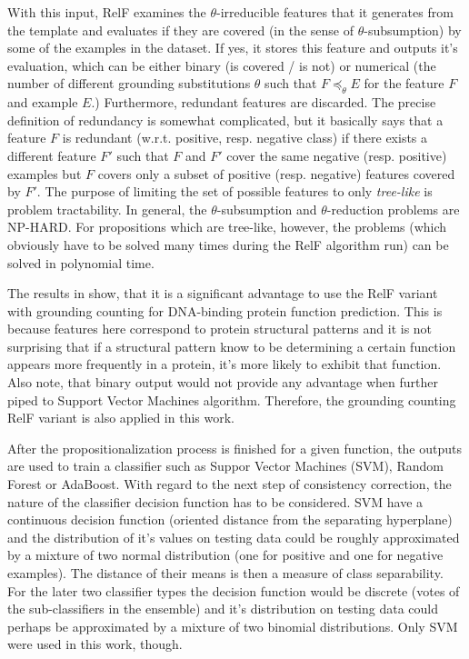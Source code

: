 \documentclass[11pt,twoside,a4paper]{book}
\begin{document}
With this input, RelF examines the $\theta$-irreducible features that it generates from
the template and evaluates if they are covered (in the sense of $\theta$-subsumption)
by some of the examples in the dataset.
If yes, it stores this feature and outputs it's evaluation,
which can be either binary (is covered / is not)
or numerical (the number of different grounding substitutions $\theta$ 
such that $F \preceq_{\theta} E$ for the feature $F$ and example $E$.)
Furthermore, redundant features are discarded.
The precise definition of redundancy \cite{relf} is somewhat complicated,
but it basically says that a feature $F$ is redundant (w.r.t. positive, resp. negative class)
if there exists a different feature $F'$ such that $F$ and $F'$ cover
the same negative (resp. positive) examples but $F$ covers only a subset
of positive (resp. negative) features covered by $F'$.
The purpose of limiting the set of possible features to only \emph{tree-like}
is problem tractability.
In general,
the $\theta$-subsumption and $\theta$-reduction problems are NP-HARD.
For propositions which are tree-like, however, the problems 
(which obviously have to be solved many times during the RelF algorithm run)
can be solved in polynomial time.

The results in \cite{szabova} show,
that it is a significant advantage to use the RelF variant with grounding counting
for DNA-binding protein function prediction.
This is because features here correspond to protein structural patterns and
it is not surprising that if a structural pattern know to be determining a certain function
appears more frequently in a protein, it's more likely to exhibit that function.
Also note, that binary output would not provide any advantage when further piped to Support Vector Machines algorithm.
Therefore, the grounding counting RelF variant is also applied in this work. 

After the propositionalization process is finished for a given function,
the outputs are used to train a classifier
such as Suppor Vector Machines (SVM), Random Forest or AdaBoost.
With regard to the next step of consistency correction,
the nature of the classifier decision function has to be considered.
SVM have a continuous decision function
(oriented distance from the separating hyperplane)
and the distribution of it's values on testing data could be 
roughly approximated by a mixture of two normal distribution (one for positive and one for negative examples).
The distance of their means is then a measure of class separability.
For the later two classifier types the decision function
would be discrete (votes of the sub-classifiers in the ensemble)
and it's distribution on testing data could perhaps be approximated by a mixture of two binomial distributions.
Only SVM were used in this work, though.
\end{document}
